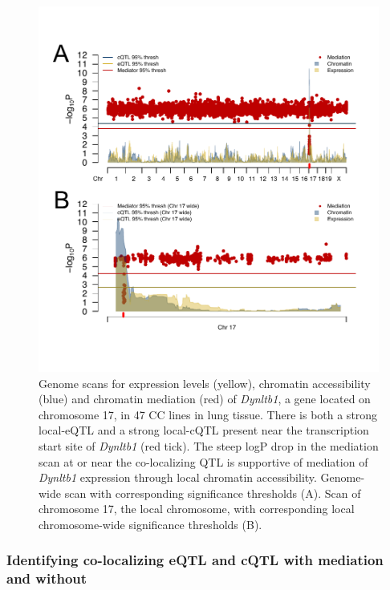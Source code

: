 \begin{figure}
\includegraphics[width=\textwidth, trim={0in 0.2in 0in 0in}, clip]{figures/6-mediation/mediation_example.pdf}
\caption[Example of evidence consistent with chromatin accessibility mediating between eQTL and gene expression]{Genome scans for expression levels (yellow), chromatin accessibility (blue) and chromatin mediation (red) of \textit{Dynltb1}, a gene located on chromosome 17, in 47 CC lines in lung tissue. There is both a strong local-eQTL and a strong local-cQTL present near the transcription start site of \textit{Dynltb1} (red tick). The steep logP drop in the mediation scan at or near the co-localizing QTL is supportive of mediation of \textit{Dynltb1} expression through local chromatin accessibility. Genome-wide scan with corresponding significance thresholds (A). Scan of chromosome 17, the local chromosome, with corresponding local chromosome-wide significance thresholds (B). \label{fig:mediation_example}}
\end{figure}

\subsubsection{Identifying co-localizing eQTL and cQTL with mediation and without}

